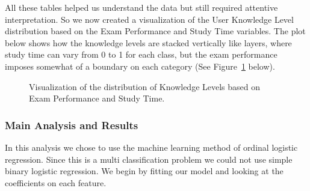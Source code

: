\documentclass[
  letterpaper,
  DIV=11,
  numbers=noendperiod]{scrartcl}
\begin{document}
All these tables helped us understand the data but still required
attentive interpretation. So we now created a visualization of the User
Knowledge Level distribution based on the Exam Performance and Study
Time variables. The plot below shows how the knowledge levels are
stacked vertically like layers, where study time can vary from 0 to 1
for each class, but the exam performance imposes somewhat of a boundary
on each category (See Figure~\ref{fig-knowledge_train_summary} below).

\begin{figure}


\caption{\label{fig-knowledge_train_summary}Visualization of the
distribution of Knowledge Levels based on Exam Performance and Study
Time.}

\end{figure}%

\subsubsection{Main Analysis and
Results}\label{main-analysis-and-results}

In this analysis we chose to use the machine learning method of ordinal
logistic regression. Since this is a multi classification problem we
could not use simple binary logistic regression. We begin by fitting our
model and looking at the coefficients on each feature.
\end{document}
